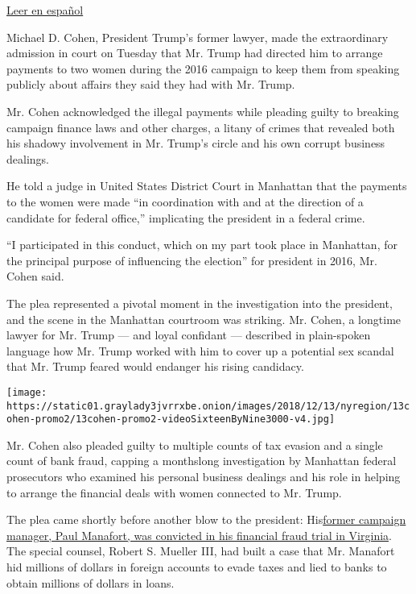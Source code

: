 \href{https://www.nytimes3xbfgragh.onion/es/2018/08/21/michael-cohen-cargos-trump}{Leer
en español}

Michael D. Cohen, President Trump's former lawyer, made the
extraordinary admission in court on Tuesday that Mr. Trump had directed
him to arrange payments to two women during the 2016 campaign to keep
them from speaking publicly about affairs they said they had with Mr.
Trump.

Mr. Cohen acknowledged the illegal payments while pleading guilty to
breaking campaign finance laws and other charges, a litany of crimes
that revealed both his shadowy involvement in Mr. Trump's circle and his
own corrupt business dealings.

He told a judge in United States District Court in Manhattan that the
payments to the women were made ``in coordination with and at the
direction of a candidate for federal office,'' implicating the president
in a federal crime.

``I participated in this conduct, which on my part took place in
Manhattan, for the principal purpose of influencing the election'' for
president in 2016, Mr. Cohen said.

The plea represented a pivotal moment in the investigation into the
president, and the scene in the Manhattan courtroom was striking. Mr.
Cohen, a longtime lawyer for Mr. Trump --- and loyal confidant ---
described in plain-spoken language how Mr. Trump worked with him to
cover up a potential sex scandal that Mr. Trump feared would endanger
his rising candidacy.

\texttt{[image: https://static01.graylady3jvrrxbe.onion/images/2018/12/13/nyregion/13cohen-promo2/13cohen-promo2-videoSixteenByNine3000-v4.jpg]}

Mr. Cohen also pleaded guilty to multiple counts of tax evasion and a
single count of bank fraud, capping a monthslong investigation by
Manhattan federal prosecutors who examined his personal business
dealings and his role in helping to arrange the financial deals with
women connected to Mr. Trump.

The plea came shortly before another blow to the president:
His\href{https://www.nytimes3xbfgragh.onion/2018/08/21/us/politics/paul-manafort-trial-verdict.html}{former
campaign manager, Paul Manafort, was convicted in his financial fraud
trial in Virginia}. The special counsel, Robert S. Mueller III, had
built a case that Mr. Manafort hid millions of dollars in foreign
accounts to evade taxes and lied to banks to obtain millions of dollars
in loans.

